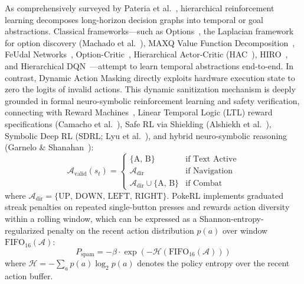 \documentclass[journal,10pt,twocolumn]{IEEEtran}
\begin{document}
As comprehensively surveyed by Pateria et al.~\cite{pateria2021hierarchical}, hierarchical reinforcement learning decomposes long-horizon decision graphs into temporal or goal abstractions. Classical frameworks---such as Options~\cite{sutton1999options}, the Laplacian framework for option discovery (Machado et al.~\cite{machado2017laplacian}), MAXQ Value Function Decomposition~\cite{dietterich2000maxq}, FeUdal Networks~\cite{dayan1992feudal,vezhnevets2017feudal}, Option-Critic~\cite{bacon2017optioncritic}, Hierarchical Actor-Critic (HAC~\cite{levy2019hac}), HIRO~\cite{nachum2018hiro}, and Hierarchical DQN~\cite{kulkarni2016hdqn}---attempt to learn temporal abstractions end-to-end. In contrast, Dynamic Action Masking directly exploits hardware execution state to zero the logits of invalid actions. This dynamic sanitization mechanism is deeply grounded in formal neuro-symbolic reinforcement learning and safety verification, connecting with Reward Machines~\cite{toroicarte2022rewardmachines}, Linear Temporal Logic (LTL) reward specifications (Camacho et al.~\cite{camacho2019ltl}), Safe RL via Shielding (Alshiekh et al.~\cite{alshiekh2018shielding}), Symbolic Deep RL (SDRL; Lyu et al.~\cite{lyu2019sdrl}), and hybrid neuro-symbolic reasoning (Garnelo \& Shanahan~\cite{garnelo2019reconciling}):
\begin{equation}
\mathcal{A}_{\text{valid}}(s_t) = \begin{cases}
\{\text{A, B}\} & \text{if Text Active} \\
\mathcal{A}_{\text{dir}} & \text{if Navigation} \\
\mathcal{A}_{\text{dir}} \cup \{\text{A, B}\} & \text{if Combat}
\end{cases}
\end{equation}
where $\mathcal{A}_{\text{dir}} = \{\text{UP, DOWN, LEFT, RIGHT}\}$. PokeRL implements graduated streak penalties on repeated single-button presses and rewards action diversity within a rolling window, which can be expressed as a Shannon-entropy-regularized penalty on the recent action distribution $p(a)$ over window $\text{FIFO}_{16}(\mathcal{A})$:
\begin{equation}
P_{\text{spam}} = -\beta \cdot \exp\left( -\mathcal{H}(\text{FIFO}_{16}(\mathcal{A})) \right)
\end{equation}
where $\mathcal{H} = -\sum_a p(a)\log_2 p(a)$ denotes the policy entropy over the recent action buffer.
\end{document}
